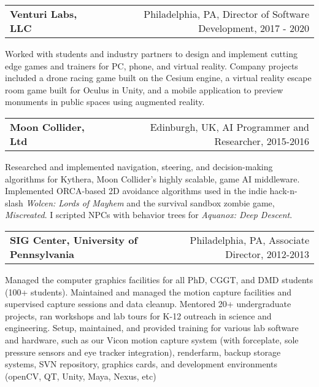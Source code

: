 \medskip
\medskip

\needspace{6em}
\begin{tabular*}{7.1in}{@{}l@{\extracolsep\fill}r}
{\large {\bf Venturi Labs, LLC}} & Philadelphia, PA, Director of Software Development, 2017 - 2020\\
\end{tabular*}

Worked with students and industry partners to design and implement cutting edge
games and trainers for PC, phone, and virtual reality. Company projects included 
a drone racing game built on the Cesium engine, a virtual reality escape room
game built for Oculus in Unity, and a mobile application to preview monuments
in public spaces using augmented reality.

\medskip
\medskip

\needspace{6em}
\begin{tabular*}{7.1in}{@{}l@{\extracolsep\fill}r}
{\large {\bf Moon Collider, Ltd}} & Edinburgh, UK, AI Programmer and Researcher, 2015-2016\\
\end{tabular*}

Researched and implemented navigation, steering, and decision-making algorithms
for Kythera, Moon Collider's highly scalable, game AI middleware. Implemented
ORCA-based 2D avoidance algorithms used in the indie hack-n-slash \emph{Wolcen:
Lords of Mayhem} and the survival sandbox zombie game, \emph{Miscreated}.
I scripted NPCs with behavior trees for \emph{Aquanox: Deep Descent}.

\medskip
\medskip

\needspace{6em}
\begin{tabular*}{7.1in}{@{}l@{\extracolsep\fill}r}
{\large {\bf SIG Center, University of Pennsylvania}} & Philadelphia, PA, Associate Director, 2012-2013\\
\end{tabular*}

Managed the computer graphics facilities for all PhD, CGGT, and DMD students
(100+ students). Maintained and managed the motion capture facilities and
supervised capture sessions and data cleanup. Mentored 20+ undergraduate
projects, ran workshops and lab tours for K-12 outreach in science and
engineering. Setup, maintained, and provided training for various lab software
and hardware, such as our Vicon motion capture system (with forceplate, sole
pressure sensors and eye tracker integration), renderfarm, backup storage
systems, SVN repository, graphics cards, and development environments (openCV,
QT, Unity, Maya, Nexus, etc)

